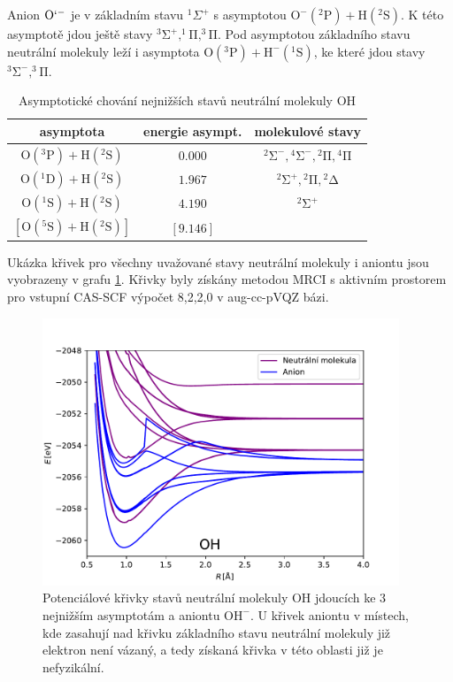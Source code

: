  Anion $\mathrm{O`^-}$ je v základním stavu $^1\Sigma^+$ s asymptotou
  $\mathrm{O^-}(^2\mathrm{P}) + \mathrm{H}(^2\mathrm{S})$. 
  K této asymptotě jdou ještě stavy
  $\mathrm{^3\Sigma^+,^1\Pi, ^3\Pi}$.
 Pod asymptotou základního stavu neutrální molekuly leží i asymptota 
 $\mathrm{O}(^3\mathrm{P}) + \mathrm{H^-}(^1\mathrm{S})$, 
 ke které jdou stavy $\mathrm{^3\Sigma^-, ^3\Pi}$.

\begin{table}
\centering
\caption{Asymptotické chování nejnižších stavů neutrální molekuly OH}
\label{taOHas}
\bigskip
\begin{tabular}{ccc}
\toprule
asymptota & energie asympt. & molekulové stavy \\ 
\midrule
$\mathrm{O}(^3\mathrm{P}) + \mathrm{H}(^2\mathrm{S})$ & $0.000$ & $\mathrm{^2\Sigma^-}, \mathrm{^4\Sigma^-},\mathrm{^2\Pi},\mathrm{^4\Pi}$ \\ 
$\mathrm{O}(^1\mathrm{D}) + \mathrm{H}(^2\mathrm{S})$ & $1.967$ & $\mathrm{^2\Sigma^+}, \mathrm{^2\Pi}, \mathrm{^2\Delta}$ \\ 
$\mathrm{O}(^1\mathrm{S}) + \mathrm{H}(^2\mathrm{S})$ & $4.190$ & $ \mathrm{^2\Sigma^+}$ \\ 
$[\mathrm{O}(^5\mathrm{S}) + \mathrm{H}(^2\mathrm{S})]$ & $[9.146]$ \\ 
\bottomrule
\end{tabular} 
\end{table}

Ukázka křivek pro všechny uvažované stavy neutrální molekuly i aniontu jsou vyobrazeny v grafu \ref{grOHL}. Křivky byly získány metodou MRCI s aktivním prostorem pro vstupní CAS-SCF výpočet 8,2,2,0 v aug-cc-pVQZ bázi.


\begin{figure}
\centering
\includegraphics[width=0.95\textwidth]{../img/OHstates.pdf}
\caption{Potenciálové křivky stavů neutrální molekuly OH jdoucích ke 3 nejnižším asymptotám a aniontu $\mathrm{OH^-}$. U křivek aniontu v místech, kde zasahují nad křivku základního stavu neutrální molekuly již elektron není vázaný, a tedy získaná křivka v této oblasti již je nefyzikální.}
\label{grOHL}
\end{figure}

